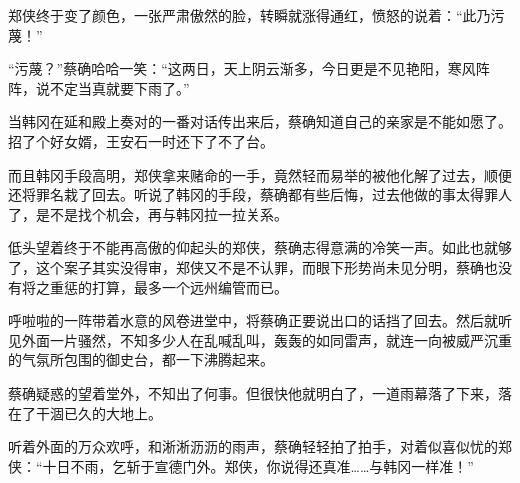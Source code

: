 郑侠终于变了颜色，一张严肃傲然的脸，转瞬就涨得通红，愤怒的说着：“此乃污蔑！”

“污蔑？”蔡确哈哈一笑：“这两日，天上阴云渐多，今日更是不见艳阳，寒风阵阵，说不定当真就要下雨了。”

当韩冈在延和殿上奏对的一番对话传出来后，蔡确知道自己的亲家是不能如愿了。招了个好女婿，王安石一时还下了不了台。

而且韩冈手段高明，郑侠拿来赌命的一手，竟然轻而易举的被他化解了过去，顺便还将罪名栽了回去。听说了韩冈的手段，蔡确都有些后悔，过去他做的事太得罪人了，是不是找个机会，再与韩冈拉一拉关系。

低头望着终于不能再高傲的仰起头的郑侠，蔡确志得意满的冷笑一声。如此也就够了，这个案子其实没得审，郑侠又不是不认罪，而眼下形势尚未见分明，蔡确也没有将之重惩的打算，最多一个远州编管而已。

呼啦啦的一阵带着水意的风卷进堂中，将蔡确正要说出口的话挡了回去。然后就听见外面一片骚然，不知多少人在乱喊乱叫，轰轰的如同雷声，就连一向被威严沉重的气氛所包围的御史台，都一下沸腾起来。

蔡确疑惑的望着堂外，不知出了何事。但很快他就明白了，一道雨幕落了下来，落在了干涸已久的大地上。

听着外面的万众欢呼，和淅淅沥沥的雨声，蔡确轻轻拍了拍手，对着似喜似忧的郑侠：“十日不雨，乞斩于宣德门外。郑侠，你说得还真准……与韩冈一样准！”

